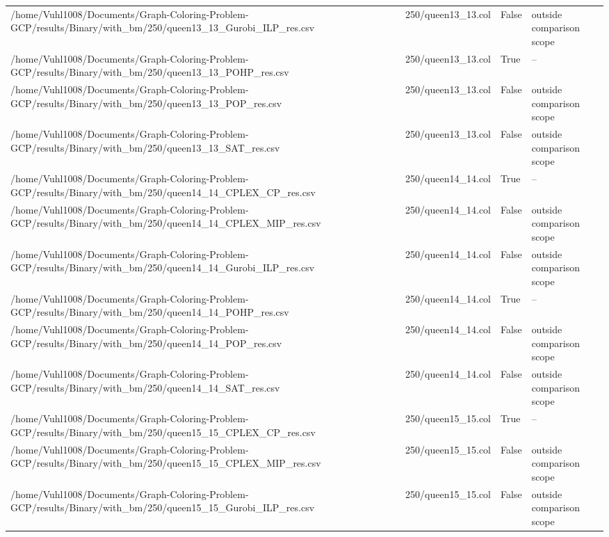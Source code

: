 \begin{table}[htbp]
\begin{tabular}{llll}
/home/Vuhl1008/Documents/Graph-Coloring-Problem-GCP/results/Binary/with\_bm/250/queen13\_13\_Gurobi\_ILP\_res.csv & 250/queen13\_13.col & False & outside comparison scope \\
/home/Vuhl1008/Documents/Graph-Coloring-Problem-GCP/results/Binary/with\_bm/250/queen13\_13\_POHP\_res.csv & 250/queen13\_13.col & True & -- \\
/home/Vuhl1008/Documents/Graph-Coloring-Problem-GCP/results/Binary/with\_bm/250/queen13\_13\_POP\_res.csv & 250/queen13\_13.col & False & outside comparison scope \\
/home/Vuhl1008/Documents/Graph-Coloring-Problem-GCP/results/Binary/with\_bm/250/queen13\_13\_SAT\_res.csv & 250/queen13\_13.col & False & outside comparison scope \\
/home/Vuhl1008/Documents/Graph-Coloring-Problem-GCP/results/Binary/with\_bm/250/queen14\_14\_CPLEX\_CP\_res.csv & 250/queen14\_14.col & True & -- \\
/home/Vuhl1008/Documents/Graph-Coloring-Problem-GCP/results/Binary/with\_bm/250/queen14\_14\_CPLEX\_MIP\_res.csv & 250/queen14\_14.col & False & outside comparison scope \\
/home/Vuhl1008/Documents/Graph-Coloring-Problem-GCP/results/Binary/with\_bm/250/queen14\_14\_Gurobi\_ILP\_res.csv & 250/queen14\_14.col & False & outside comparison scope \\
/home/Vuhl1008/Documents/Graph-Coloring-Problem-GCP/results/Binary/with\_bm/250/queen14\_14\_POHP\_res.csv & 250/queen14\_14.col & True & -- \\
/home/Vuhl1008/Documents/Graph-Coloring-Problem-GCP/results/Binary/with\_bm/250/queen14\_14\_POP\_res.csv & 250/queen14\_14.col & False & outside comparison scope \\
/home/Vuhl1008/Documents/Graph-Coloring-Problem-GCP/results/Binary/with\_bm/250/queen14\_14\_SAT\_res.csv & 250/queen14\_14.col & False & outside comparison scope \\
/home/Vuhl1008/Documents/Graph-Coloring-Problem-GCP/results/Binary/with\_bm/250/queen15\_15\_CPLEX\_CP\_res.csv & 250/queen15\_15.col & True & -- \\
/home/Vuhl1008/Documents/Graph-Coloring-Problem-GCP/results/Binary/with\_bm/250/queen15\_15\_CPLEX\_MIP\_res.csv & 250/queen15\_15.col & False & outside comparison scope \\
/home/Vuhl1008/Documents/Graph-Coloring-Problem-GCP/results/Binary/with\_bm/250/queen15\_15\_Gurobi\_ILP\_res.csv & 250/queen15\_15.col & False & outside comparison scope \\

\end{tabular}
\end{table}
